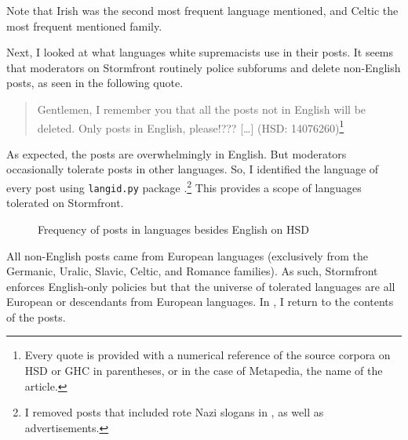 \documentclass[output=paper,colorlinks,citecolor=brown]{langscibook}
\begin{document}
Note that Irish was the second most frequent language mentioned, and Celtic the most frequent mentioned family.

Next, I looked at what languages white supremacists use in their posts. It seems that moderators on Stormfront routinely police subforums and delete non-English posts, as seen in the following quote.

\begin{quote} 
Gentlemen, I remember you that all the posts not in English will be deleted. Only posts in English, please!??? {[}\ldots{]} 
(HSD: 14076260)\footnote{Every quote is provided with a numerical reference of the source corpora on HSD or GHC in parentheses, or in the case of Metapedia, the name of the article.} 
\end{quote}

\noindent As expected, the posts are overwhelmingly in English. But moderators occasionally tolerate posts in other languages. So, I identified the language of every post using \texttt{langid.py} package \citep{jp:LuiBaldwin2012}.\footnote{I removed posts that included rote Nazi slogans in , as well as advertisements.} This provides a scope of languages tolerated on Stormfront.

\begin{figure}[th]
    \small
    \PowellTableTwo
    \caption{Frequency of posts in languages besides English on HSD}
    \label{fig:powell:2}
\end{figure}

All non-English posts came from European languages (exclusively from the Germanic,  Uralic, Slavic, Celtic, and Romance families). As such, Stormfront enforces English-only policies but that the universe of tolerated languages are all European or descendants from European languages. In , I return to the contents of the posts.
\end{document}

